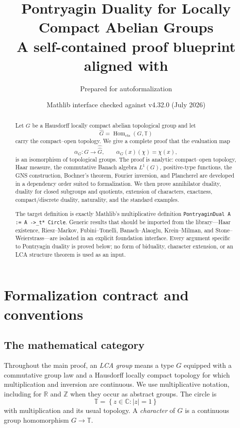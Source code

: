\documentclass[11pt]{article}
\title{Pontryagin Duality for Locally Compact Abelian Groups\\
\large A self-contained proof blueprint aligned with \mathlib}
\author{Prepared for autoformalization}
\date{Mathlib interface checked against v4.32.0 (July 2026)}
\theoremstyle{definition}
\theoremstyle{remark}
\newcommand{\T}{\mathbb T}
\newcommand{\C}{\mathbb C}
\newcommand{\R}{\mathbb R}
\newcommand{\Z}{\mathbb Z}
\newcommand{\Hom}{\operatorname{Hom}}
\newcommand{\Lp}[1]{L^{#1}}
\newcommand{\dual}[1]{\widehat{#1}}
\newcommand{\bidual}[1]{\widehat{\widehat{#1}}}
\newcommand{\abs}[1]{\lvert #1\rvert}
\newcommand{\set}[1]{\left\{#1\right\}}
\newcommand{\mathlib}{\textsf{Mathlib}}
\begin{document}
\maketitle

\begin{abstract}
Let $G$ be a Hausdorff locally compact abelian topological group and let
\[
  \dual G=\Hom_{\mathrm{cts}}(G,\T)
\]
carry the compact--open topology.  We give a complete proof that the evaluation map
\[
  \alpha_G:G\longrightarrow\bidual G,
  \qquad \alpha_G(x)(\chi)=\chi(x),
\]
is an isomorphism of topological groups.  The proof is analytic: compact--open topology,
Haar measure, the commutative Banach algebra $\Lp1(G)$, positive-type functions, the GNS
construction, Bochner's theorem, Fourier inversion, and Plancherel are developed in a
dependency order suited to formalization.  We then prove annihilator duality, duality for
closed subgroups and quotients, extension of characters, exactness, compact/discrete
duality, naturality, and the standard examples.

The target definition is exactly \mathlib's multiplicative definition
\texttt{PontryaginDual A := A ->\_t* Circle}.  Generic results that should be imported
from the library---Haar existence, Riesz--Markov, Fubini--Tonelli, Banach--Alaoglu,
Krein--Milman, and Stone--Weierstrass---are isolated in an explicit foundation interface.
Every argument specific to Pontryagin duality is proved below; no form of biduality,
character extension, or an LCA structure theorem is used as an input.
\end{abstract}

\tableofcontents

\section{Formalization contract and conventions}
\label{sec:contract}

\subsection{The mathematical category}

Throughout the main proof, an \emph{LCA group} means a type $G$ equipped with a
commutative group law and a Hausdorff locally compact topology for which multiplication
and inversion are continuous.  We use multiplicative notation, including for $\R$ and
$\Z$ when they occur as abstract groups.  The circle is
\[
  \T=\set{z\in\C:\abs z=1}
\]
with multiplication and its usual topology.  A \emph{character} of $G$ is a continuous
group homomorphism $G\to\T$.
\end{document}
